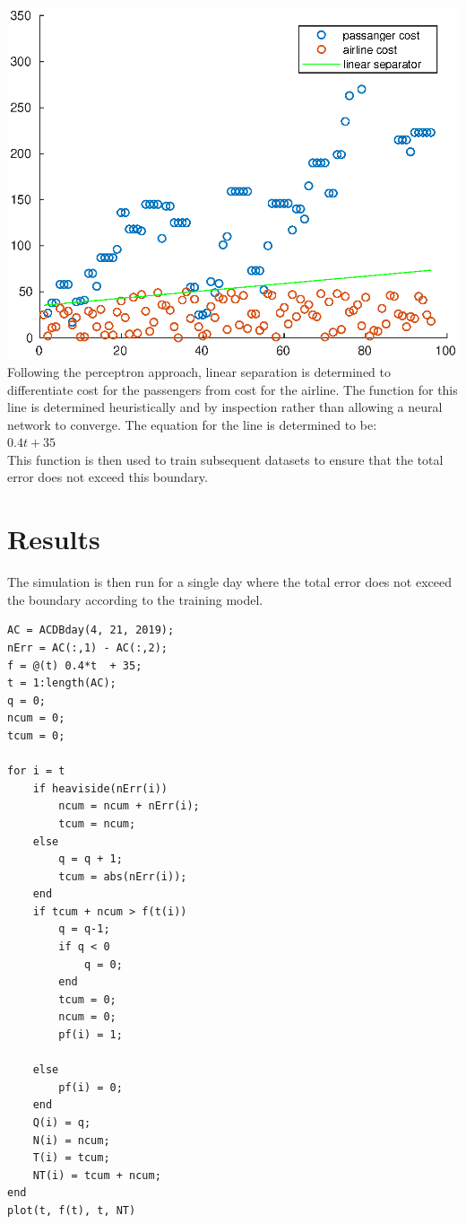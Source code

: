 \documentclass[12pt]{article}
\begin{document}
\includegraphics{linsep.eps}
\\
Following the perceptron approach, linear separation is determined to differentiate cost for the passengers from cost for the airline. The function for this line is determined heuristically and by inspection rather than allowing a neural network to converge. The equation for the line is determined to be: \\
$0.4t + 35$ \\
This function is then used to train subsequent datasets to ensure that the total error does not exceed this boundary.

\section{Results}
The simulation is then run for a single day where the total error does not exceed the boundary according to the training model.

\begin{verbatim}
AC = ACDBday(4, 21, 2019);
nErr = AC(:,1) - AC(:,2);
f = @(t) 0.4*t  + 35;
t = 1:length(AC);
q = 0;
ncum = 0;
tcum = 0;

for i = t
    if heaviside(nErr(i))
        ncum = ncum + nErr(i);
        tcum = ncum;
    else
        q = q + 1;
        tcum = abs(nErr(i));
    end
    if tcum + ncum > f(t(i))
        q = q-1;
        if q < 0
            q = 0;
        end
        tcum = 0;
        ncum = 0;
        pf(i) = 1;

    else
        pf(i) = 0;
    end
    Q(i) = q;
    N(i) = ncum;
    T(i) = tcum;
    NT(i) = tcum + ncum;
end
plot(t, f(t), t, NT)
\end{verbatim}
\end{document}
